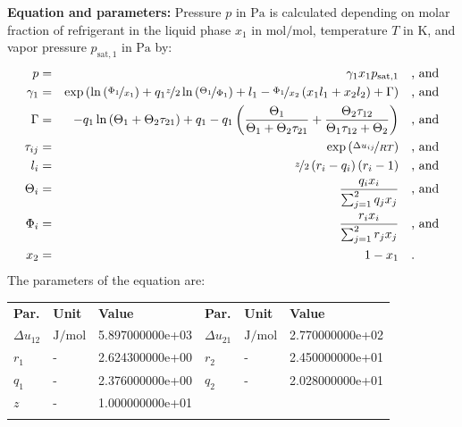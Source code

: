 \textbf{Equation and parameters:}
\newline
%
Pressure $p$ in $\si{\pascal}$ is calculated depending on molar fraction of refrigerant in the liquid phase $x_1$ in $\si{\mole\per\mole}$, temperature $T$ in $\si{\kelvin}$, and vapor pressure $p_\mathrm{sat,1}$ in $\si{\pascal}$ by:
%
\begin{equation*}
\begin{split}
p &=& \gamma_1 x_1 p_\mathrm{sat,1} & \quad\text{, and} \\
\gamma_1 &=& \exp \left( \ln \left( \nicefrac{\Phi_1}{x_1} \right) + q_1 \nicefrac{z}{2} \ln \left( \nicefrac{\Theta_1}{\Phi_1} \right) + l_1 - \nicefrac{\Phi_1}{x_2} \left( x_1 l_1 + x_2 l_2 \right) + \Gamma \right) & \quad\text{, and} \\
\Gamma &=& - q_1 \ln \left( \Theta_1 + \Theta_2 \tau_{21} \right) + q_1 - q_1 \left( \frac{\Theta_1}{\Theta_1 + \Theta_2 \tau_{21}} + \frac{\Theta_2 \tau_{12}}{\Theta_1 \tau_{12} + \Theta_2} \right) & \quad\text{, and} \\
\tau_{ij} &=& \exp \left( \nicefrac{\Delta u_{ij}}{R T} \right) & \quad\text{, and} \\
l_i &=& \nicefrac{z}{2} \left( r_i - q_i \right) \left(r_i - 1 \right) & \quad\text{, and} \\
\Theta_i &=& \frac{q_i x_i}{\sum_{j=1}^{2} q_j x_j} & \quad\text{, and} \\
\Phi_i &=& \frac{r_i x_i}{\sum_{j=1}^{2} r_j x_j} & \quad\text{, and} \\
x_2 &=& 1 - x_1  & \quad\text{.} \\
\end{split}
\end{equation*}
%
The parameters of the equation are:
%
\begin{longtable}[l]{lll|lll}
\toprule
\addlinespace
\textbf{Par.} & \textbf{Unit} & \textbf{Value} &	\textbf{Par.} & \textbf{Unit} & \textbf{Value} \\
\addlinespace
\midrule
\endhead

\bottomrule
\endfoot
\bottomrule
\endlastfoot
\addlinespace

$\Delta u_{12}$ & $\si{\joule\per\mole}$ & 5.897000000e+03 & $\Delta u_{21}$ & $\si{\joule\per\mole}$ & 2.770000000e+02 \\
$r_{1}$ & - & 2.624300000e+00 & $r_{2}$ & - & 2.450000000e+01 \\
$q_{1}$ & - & 2.376000000e+00 & $q_{2}$ & - & 2.028000000e+01 \\
$z$ & - & 1.000000000e+01 & & &  \\

\addlinespace\end{longtable}

